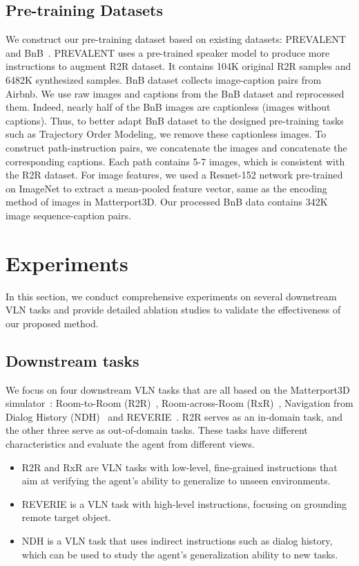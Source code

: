 \documentclass[10pt,twocolumn,letterpaper]{article}
\begin{document}
\subsection{Pre-training Datasets}
We construct our pre-training dataset based on existing datasets: PREVALENT~\cite{prevalent} and BnB~\cite{airbert}. PREVALENT uses a pre-trained speaker model to produce more instructions to augment R2R dataset. It contains 104K original R2R samples and 6482K synthesized samples. BnB dataset collects image-caption pairs from Airbnb. We use raw images and captions from the BnB dataset and reprocessed them. 
Indeed, nearly half of the BnB images are captionless (\ie images without captions).
Thus, to better adapt BnB dataset to the designed pre-training tasks such as Trajectory Order Modeling, we remove these captionless images. 
To construct path-instruction pairs, we concatenate the images and concatenate the corresponding captions. 
Each path contains 5-7 images, which is consistent with the R2R dataset. 
For image features, we used a Resnet-152 network pre-trained on ImageNet to extract a mean-pooled feature vector, same as the encoding method of images in Matterport3D.
Our processed BnB data contains 342K image sequence-caption pairs. 

\section{Experiments}
\label{sec:experiments}
In this section, we conduct comprehensive experiments on several downstream VLN tasks and provide detailed ablation studies to validate the effectiveness of our proposed method. 
\subsection{Downstream tasks}
We focus on four downstream VLN tasks that are all based on the Matterport3D simulator~\cite{r2r}: Room-to-Room (R2R)~\cite{r2r}, Room-across-Room (RxR)~\cite{rxr}, Navigation from Dialog History (NDH)~\cite{ndh} and REVERIE~\cite{reverie}. R2R serves as an in-domain task, and the other three serve as out-of-domain tasks. These tasks have different characteristics and evaluate the agent from different views.
\begin{itemize}[itemsep=2pt,topsep=2pt,parsep=2pt]
    \item R2R and RxR are VLN tasks with low-level, fine-grained instructions that aim at verifying the agent's ability to generalize to unseen environments.
    \item REVERIE is a VLN task with high-level instructions, focusing on grounding remote target object.
    \item NDH is a VLN task that uses indirect instructions such as dialog history, which can be used  to study the agent's generalization ability to new tasks.
\end{itemize}
\end{document}
